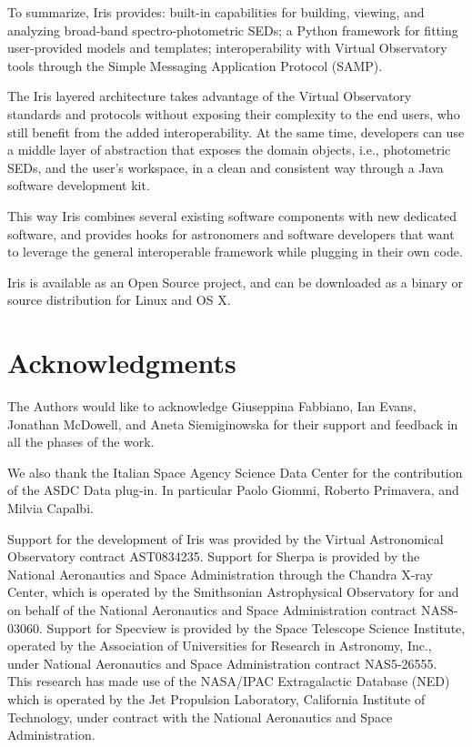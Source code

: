 \documentclass[preprint,authoryear,5p]{elsarticle}
\begin{document}
To summarize, Iris provides: built-in capabilities for building, viewing, and
analyzing broad-band spec\-tro-pho\-to\-met\-ric SEDs; a Python framework for fitting
user-pro\-vid\-ed models and templates; interoperability with Virtual Observatory
tools through the Simple Messaging Application Protocol (SAMP).

The Iris layered architecture takes advantage of the Virtual Observatory
standards and protocols without exposing their complexity to the end users,
who still benefit from the added interoperability. At the same time, developers
can use a middle layer of abstraction that exposes the domain objects, i.e.,
photometric SEDs, and the user's workspace, in a clean and consistent
way through a Java software development kit.

\begin{sloppypar}
This way Iris combines several existing software components with new dedicated
software, and provides hooks for astronomers and software developers that want to
leverage the general interoperable framework while plugging in their own code.
\end{sloppypar}

Iris is available as an Open Source project, and can be downloaded as a binary
or source distribution for Linux and OS X.


\section*{Acknowledgments}
The Authors would like to acknowledge Giuseppina Fabbiano, Ian Evans,
Jonathan McDowell, and Aneta Siemiginowska
for their support and feedback in all the phases of the work.

We also thank the Italian Space Agency Science Data Center for the contribution
of the ASDC Data plug-in. In particular Paolo Giommi, Roberto Primavera, and
Milvia Capalbi.

Support for the development of Iris was provided by
the Virtual Astronomical Observatory contract AST0834235. Support for Sherpa is
provided by the National Aeronautics and Space Administration through the
Chandra X-ray Center, which is operated by the Smithsonian Astrophysical
Observatory for and on behalf of the National Aeronautics and Space
Administration contract NAS8-03060.  Support for Specview is provided by the
Space Telescope Science Institute, operated by the Association of Universities
for Research in Astronomy, Inc., under National Aeronautics and Space
Administration contract NAS5-26555. This research has made use of the NASA/IPAC
Extragalactic Database (NED) which is operated by the Jet Propulsion Laboratory,
California Institute of Technology, under contract with the National Aeronautics
and Space Administration.


\end{document}

